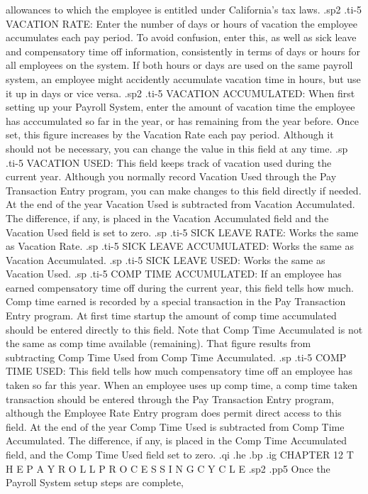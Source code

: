 allowances to which the employee is entitled under California's tax laws.
.sp2
.ti-5
VACATION RATE: Enter the number of days or hours of vacation the
employee accumulates each pay period.  To avoid confusion, enter this,
as well as sick leave and compensatory time off information, consistently
in terms of days or hours for all employees on the system.  If both hours
or days are used on the same payroll system,
an employee might accidently accumulate vacation time in hours, but use
it up in days or vice versa.
.sp2
.ti-5
VACATION ACCUMULATED: When first setting up your Payroll System,
enter the amount of vacation time the employee has acccumulated so far in the
year, or has remaining from the year before.
Once set,
this figure increases by the Vacation Rate each
pay period. Although it should not be necessary, you can change
the value in this field
at any time.
.sp
.ti-5
VACATION USED: This field keeps track of vacation used
during the current year.  Although you normally record Vacation Used
through the Pay Transaction Entry program, you can make changes to this
field directly if needed.
At the end of the year Vacation Used is subtracted from
Vacation Accumulated. The difference, if any, is placed in the
Vacation Accumulated field and the Vacation Used field is set to zero.
.sp
.ti-5
SICK LEAVE RATE: Works the same as Vacation Rate.
.sp
.ti-5
SICK LEAVE ACCUMULATED: Works the same as Vacation Accumulated.
.sp
.ti-5
SICK LEAVE USED: Works the same as Vacation Used.
.sp
.ti-5
COMP TIME ACCUMULATED: If an employee has earned compensatory time off during
the current year,
this field tells how much.  Comp time earned is recorded
by a special transaction
in the
Pay Transaction Entry program. At first time startup the
amount of comp time accumulated should be entered directly to this field.
Note that Comp Time Accumulated is not the same as comp time available
(remaining).  That figure results from subtracting Comp Time Used from
Comp Time Accumulated.
.sp
.ti-5
COMP TIME USED: This field tells how much compensatory time off an employee
has taken so far this year.  When an employee uses up comp time,
a comp time taken transaction should
be entered through the Pay Transaction Entry program, although the Employee
Rate Entry program
does permit direct access to this field.  At the end of the year
Comp Time Used is subtracted from Comp Time Accumulated.  The difference,
if any, is placed in the Comp Time Accumulated field, and the Comp Time
Used field set to zero.
.qi
.he
.bp
.ig
CHAPTER 12
T H E	P A Y R O L L	P R O C E S S I N G    C Y C L E
.sp2
.pp5
Once the Payroll System setup steps are complete,
